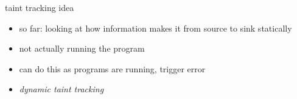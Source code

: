 
\begin{frame}{taint tracking idea}
    \begin{itemize}
        \item so far: looking at how information makes it from source to sink statically
        \item not actually running the program
        \vspace{.5cm}
        \item can do this as programs are running, trigger error
        \vspace{.5cm}
        \item \textit{dynamic taint tracking}
    \end{itemize}
\end{frame}


